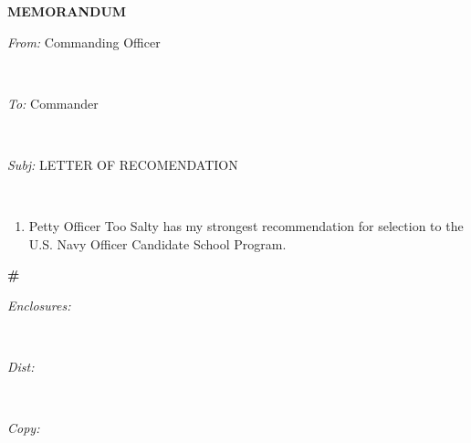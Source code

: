 \documentclass[11pt]{article}
\begin{document}
\vspace*{1cm}

\begin{flushleft}
\hspace*{-4cm}\textsc{\Large \textbf{MEMORANDUM}}\\[0.5cm]
\begin{minipage}{0.4\textwidth}
\hspace*{-4cm}\large
\emph{From:}
Commanding Officer
\end{minipage}\\[0.25cm]

\begin{minipage}{0.4\textwidth}
\hspace*{-4cm}\large
\emph{To:} 
Commander
\end{minipage}\\[0.25cm]

\begin{minipage}{0.4\textwidth}
\hspace*{-4cm}\large
\emph{Subj:} 
LETTER OF RECOMENDATION
\end{minipage}\\[0.25cm]
\end{flushleft}

\begin{enumerate}
\item Petty Officer Too Salty has my strongest recommendation for selection to the U.S. Navy Officer Candidate School Program.
\end{enumerate}

\begin{center}
\textbf{\#}
\end{center}

\begin{flushleft}
\begin{minipage}{0.4\textwidth}
\hspace*{-4cm}\large
\emph{Enclosures:} 
\end{minipage}\\[0.25cm]
\begin{minipage}{0.4\textwidth}
\hspace*{-4cm}\large
\emph{Dist:} 
\end{minipage}\\[0.25cm]
\begin{minipage}{0.4\textwidth}
\hspace*{-4cm}\large
\emph{Copy:} 
\end{minipage}\\[0.25cm]
\end{flushleft}
\end{document}
